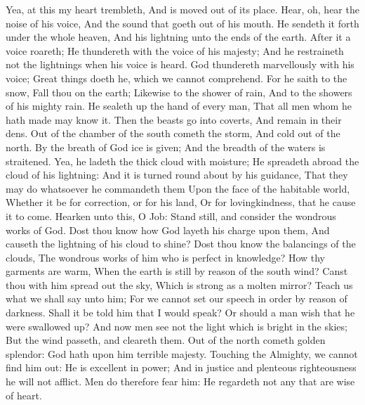 Yea, at this my heart trembleth, And is moved out of its place.  Hear, oh, hear the noise of his voice, And the sound that goeth out of his mouth.  He sendeth it forth under the whole heaven, And his lightning unto the ends of the earth.  After it a voice roareth; He thundereth with the voice of his majesty; And he restraineth not the lightnings when his voice is heard.  God thundereth marvellously with his voice; Great things doeth he, which we cannot comprehend.  For he saith to the snow, Fall thou on the earth; Likewise to the shower of rain, And to the showers of his mighty rain.  He sealeth up the hand of every man, That all men whom he hath made may know it.  Then the beasts go into coverts, And remain in their dens.  Out of the chamber of the south cometh the storm, And cold out of the north.  By the breath of God ice is given; And the breadth of the waters is straitened.  Yea, he ladeth the thick cloud with moisture; He spreadeth abroad the cloud of his lightning:  And it is turned round about by his guidance, That they may do whatsoever he commandeth them Upon the face of the habitable world,  Whether it be for correction, or for his land, Or for lovingkindness, that he cause it to come.  Hearken unto this, O Job: Stand still, and consider the wondrous works of God.  Dost thou know how God layeth his charge upon them, And causeth the lightning of his cloud to shine?  Dost thou know the balancings of the clouds, The wondrous works of him who is perfect in knowledge?  How thy garments are warm, When the earth is still by reason of the south wind?  Canst thou with him spread out the sky, Which is strong as a molten mirror?  Teach us what we shall say unto him; For we cannot set our speech in order by reason of darkness.  Shall it be told him that I would speak? Or should a man wish that he were swallowed up?  And now men see not the light which is bright in the skies; But the wind passeth, and cleareth them.  Out of the north cometh golden splendor: God hath upon him terrible majesty.  Touching the Almighty, we cannot find him out: He is excellent in power; And in justice and plenteous righteousness he will not afflict.  Men do therefore fear him: He regardeth not any that are wise of heart. 


